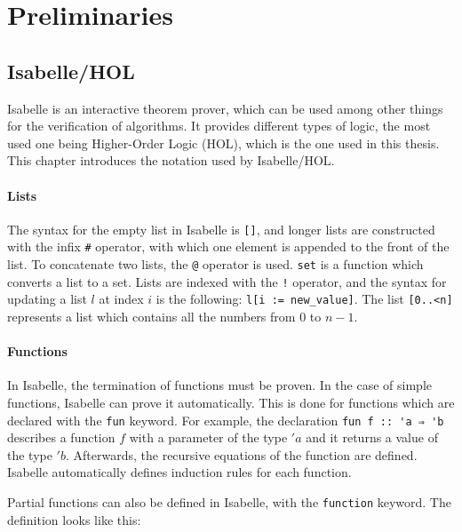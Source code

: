 
\chapter{Preliminaries}\label{chapter:preliminaries}

\section{Isabelle/HOL}

Isabelle \cite{isabelle} is an interactive theorem prover, which can be used among other things for the verification of algorithms. It provides different types of logic, the most used one being Higher-Order Logic (HOL), which is the one used in this thesis. This chapter introduces the notation used by Isabelle/HOL.

\subsubsection{Lists}

The syntax for the empty list in Isabelle is \lstinline|[]|, and longer lists are constructed with the infix \lstinline|#| operator, with which one element is appended to the front of the list. To concatenate two lists, the \lstinline|@| operator is used. \lstinline|set| is a function which converts a list to a set. Lists are indexed with the \lstinline|!| operator, and the syntax for updating a list $l$ at index $i$ is the following: \lstinline|l[i := new_value]|. The list \lstinline|[0..<n]| represents a list which contains all the numbers from $0$ to $n-1$.

\subsubsection{Functions}

In Isabelle, the termination of functions must be proven. In the case of simple functions, Isabelle can prove it automatically. This is done for functions which are declared with the \lstinline{fun} keyword. For example, the declaration \lstinline|fun f :: 'a ⇒ 'b| describes a function $f$ with a parameter of the type $'a$ and it returns a value of the type $'b$. Afterwards, the recursive equations of the function are defined. Isabelle automatically defines induction rules for each function.

Partial functions can also be defined in Isabelle, with the \lstinline{function} keyword.
The definition looks like this:

